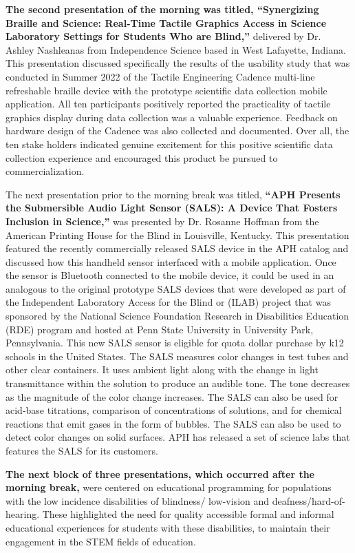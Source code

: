 \documentclass[11.5pt]{sig-alternate}
\begin{document}
\begin{large}
\textbf{The second presentation of the morning was titled, “Synergizing Braille and Science: Real-Time Tactile Graphics Access in Science Laboratory Settings for Students Who are Blind,”} delivered by Dr. Ashley Nashleanas from Independence Science based in West Lafayette, Indiana. This presentation discussed specifically the results of the usability study that was conducted in Summer 2022 of the Tactile Engineering Cadence multi-line refreshable braille device with the prototype scientific data collection mobile application. All ten participants positively reported the practicality of tactile graphics display during data collection was a valuable experience. Feedback on hardware design of the Cadence was also collected and documented. Over all, the ten stake holders indicated genuine excitement for this positive scientific data collection experience and encouraged this product be pursued to commercialization.

The next presentation prior to the morning break was titled, \textbf{“APH Presents the Submersible Audio Light Sensor (SALS): A Device That Fosters Inclusion in Science,”} was presented by Dr. Rosanne Hoffman from the American Printing House for the Blind in Louisville, Kentucky. This presentation featured the recently commercially released SALS device in the APH catalog and discussed how this handheld sensor interfaced with a mobile application. Once the sensor is Bluetooth connected to the mobile device, it could be used in an analogous to the original prototype SALS devices that were developed as part of the Independent Laboratory Access for the Blind or (ILAB) project that was sponsored by the National Science Foundation Research in Disabilities Education (RDE) program and hosted at Penn State University in University Park, Pennsylvania. This new SALS sensor is eligible for quota dollar purchase by k12 schools in the United States. The SALS measures color changes in test tubes and other clear containers. It uses ambient light along with the change in light transmittance within the solution to produce an audible tone. The tone decreases as the magnitude of the color change increases. The SALS can also be used for acid-base titrations, comparison of concentrations of solutions, and for chemical reactions that emit gases in the form of bubbles. The SALS can also be used to detect color changes on solid surfaces. APH has released a set of science labs that features the SALS for its customers.

\textbf{The next block of three presentations, which occurred after the morning break,} were centered on educational programming for populations with the low incidence disabilities of blindness/ low-vision and deafness/hard-of-hearing. These highlighted the need for quality accessible formal and informal educational experiences for students with these disabilities, to maintain their engagement in the STEM fields of education. 


\end{large}
\end{document}
